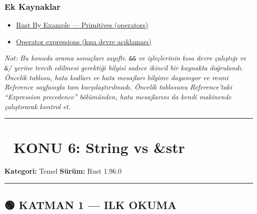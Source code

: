 \documentclass[12pt,a4paper]{article}
\begin{document}
\subsubsection{Ek Kaynaklar}\label{ek-kaynaklar-4}

\begin{itemize}
\tightlist
\item
  \href{https://doc.rust-lang.org/rust-by-example/primitives.html}{Rust By Example --- Primitives (operators)}
\item
  \href{https://m.appbook.qq.com/read/1036699272/45}{Operator expressions (kısa devre açıklaması)}
\end{itemize}

\emph{Not: Bu konuda arama sonuçları zayıftı. \texttt{\&\&} ve \texttt{\textbar{}\textbar{}} işleçlerinin kısa devre çalıştığı ve \texttt{\&}/\texttt{\textbar{}} yerine tercih edilmesi gerektiği bilgisi sadece ikincil bir kaynakta doğrulandı. Öncelik tablosu, hata kodları ve hata mesajları bilgime dayanıyor ve resmi Reference sayfasıyla tam karşılaştırılmadı. Öncelik tablosunu Reference'taki ``Expression precedence'' bölümünden, hata mesajlarını da kendi makinende çalıştırarak kontrol et.}

\begin{center}\rule{0.5\linewidth}{0.5pt}\end{center}

\section{📘 KONU 6: String vs \&str}\label{konu-6-string-vs-str}

\textbf{Kategori:} Temel \textbar{} \textbf{Sürüm:} Rust 1.96.0

\begin{center}\rule{0.5\linewidth}{0.5pt}\end{center}

\subsection{🟢 KATMAN 1 --- ILK OKUMA}\label{katman-1-—-ilk-okuma-5}
\end{document}
